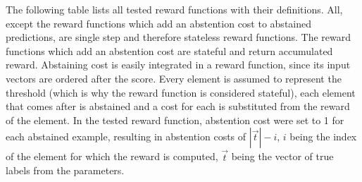 \documentclass[twoside,11pt]{article}
\begin{document}
The following table lists all tested reward functions
with their definitions. All, except the reward functions
which add an abstention cost to abstained predictions,
are single step and therefore stateless reward functions.
The reward functions which add an abstention cost are
stateful and return accumulated reward.
Abstaining cost is easily integrated in a reward function,
since its input vectors are ordered after the score.
Every element is assumed to represent the threshold (which
is why the reward function is considered stateful), each
element that comes after is abstained and a cost for each
is substituted from the reward of the element.
In the tested reward function, abstention cost were set to
1 for each abstained example, resulting in abstention costs
of $|\vec{t}| - i$, $i$ being the index of the element
for which the reward is computed, $\vec{t}$ being the
vector of true labels from the parameters.
\end{document}
